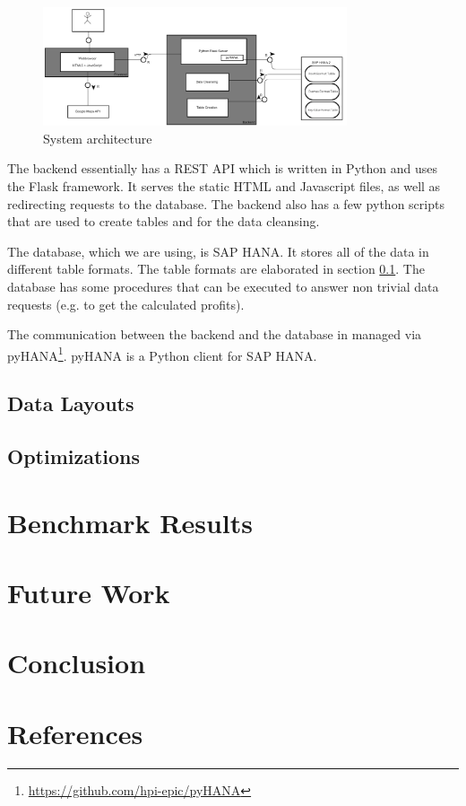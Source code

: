 \documentclass[10pt]{sig-alternate}
\begin{document}
\begin{figure}
\centering
\includegraphics[width=0.8\textwidth]{img/architecture.png}
\caption{System architecture}
\label{fig:architecture}
\end{figure}

The backend essentially has a REST API which is written in Python and uses the Flask framework. It serves the static HTML and Javascript files, as well as redirecting requests to the database. The backend also has a few python scripts that are used to create tables and for the data cleansing.

The database, which we are using, is SAP HANA. It stores all of the data in different table formats. The table formats are elaborated in section \ref{sec:data_layouts}. The database has some procedures that can be executed to answer non trivial data requests (e.g. to get the calculated profits). 

The communication between the backend and the database in managed via pyHANA\footnote{\href{https://github.com/hpi-epic/pyHANA}{https://github.com/hpi-epic/pyHANA}}. pyHANA is a Python client for SAP HANA.


\subsection{Data Layouts}
\label{sec:data_layouts}

\subsection{Optimizations}

\section{Benchmark Results}

\section{Future Work}


\section{Conclusion}

\section{References}
\end{document}
